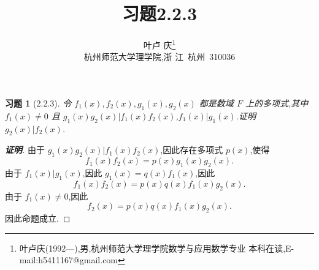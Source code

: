 \documentclass[twoside,11pt]{article}
\newtheorem*{exercise}{习题}
\begin{document}
\title{\huge{\bf{习题2.2.3}}} \author{\small{叶卢
    庆\footnote{叶卢庆(1992---),男,杭州师范大学理学院数学与应用数学专业
      本科在读,E-mail:h5411167@gmail.com}}\\{\small{杭州师范大学理学院,浙
      江~杭州~310036}}} \date{}
\maketitle





\vspace{30pt} %

\begin{exercise}[2.2.3]
  令 $f_1(x),f_2(x),g_1(x),g_2(x)$ 都是数域 $F$ 上的多项式,其中
$f_1(x)\neq 0$ 且 $g_1(x)g_2(x)|f_1(x)f_2(x)$,$f_1(x)|g_1(x)$.证明 $g_2(x)|f_2(x)$.
\end{exercise}
\begin{proof}[\textbf{证明}]
由于 $g_1(x)g_2(x)|f_1(x)f_2(x)$,因此存在多项式 $p(x)$,使得
$$
f_1(x)f_2(x)=p(x)g_1(x)g_2(x).
$$
由于 $f_1(x)|g_1(x)$,因此 $g_1(x)=q(x)f_1(x)$,因此
$$
f_1(x)f_2(x)=p(x)q(x)f_1(x)g_2(x).
$$
由于 $f_1(x)\neq 0$,因此
$$
f_2(x)=p(x)q(x)f_1(x)g_2(x).
$$
因此命题成立.
\end{proof}

\end{document}
